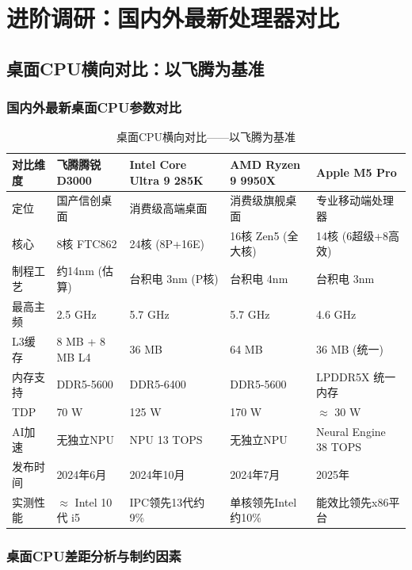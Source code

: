 \documentclass[a4paper]{article}
\begin{document}
\section{进阶调研：国内外最新处理器对比}


\subsection{桌面CPU横向对比：以飞腾为基准}

\subsubsection{国内外最新桌面CPU参数对比}



\begin{table}[H]
\centering
\caption{桌面CPU横向对比——以飞腾为基准}
\small
\begin{tabularx}{\textwidth}{lXXXX}
\toprule
\textbf{对比维度} & \textbf{飞腾腾锐D3000} & \textbf{Intel Core Ultra 9 285K} & \textbf{AMD Ryzen 9 9950X} & \textbf{Apple M5 Pro} \\
\midrule
定位 & 国产信创桌面 & 消费级高端桌面 & 消费级旗舰桌面 & 专业移动端处理器 \\
核心 & 8核 FTC862 & 24核 (8P+16E) & 16核 Zen5 (全大核) & 14核 (6超级+8高效) \\
制程工艺 & 约14nm (估算) & 台积电 3nm (P核) & 台积电 4nm & 台积电 3nm \\
最高主频 & 2.5 GHz & 5.7 GHz & 5.7 GHz & 4.6 GHz \\
L3缓存 & 8 MB + 8 MB L4 & 36 MB & 64 MB & 36 MB (统一) \\
内存支持 & DDR5-5600 & DDR5-6400 & DDR5-5600 & LPDDR5X 统一内存 \\
TDP & 70 W & 125 W & 170 W & $\approx$ 30 W \\
AI加速 & 无独立NPU & NPU 13 TOPS & 无独立NPU & Neural Engine 38 TOPS \\
发布时间 & 2024年6月 & 2024年10月 & 2024年7月 & 2025年 \\
实测性能 & $\approx$ Intel 10代 i5 & IPC领先13代约9\% & 单核领先Intel约10\% & 能效比领先x86平台 \\
\bottomrule
\end{tabularx}
\label{tab:cpu_comparison}
\end{table}

\subsubsection{桌面CPU差距分析与制约因素}
\end{document}

